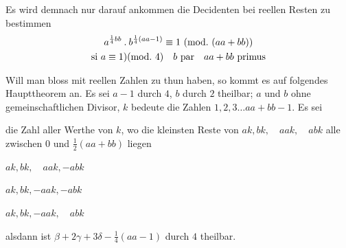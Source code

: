Es wird demnach nur darauf ankommen die Decidenten bei reellen Resten zu bestimmen
\[
\begin{gathered}
a^{\frac14bb}\mathbin{.} b^{\frac14(aa-1)}\equiv1\ (\mathrm{mod.}\ (aa+bb))\\
\text{si }a\equiv1)(\mathrm{mod.}\ 4)\quad b\text{ par}\quad aa+bb\text{ primus}
\end{gathered}
\]

Will man bloss mit reellen Zahlen zu thun haben, so kommt es auf folgendes Haupttheorem an. Es sei $a-1$ durch $4$, $b$ durch $2$ theilbar; $a$ und $b$ ohne gemeinschaftlichen Divisor, $k$ bedeute die Zahlen $1,2,3\ldots aa+bb-1$.
Es sei
\begin{list}{}{\setlength{\labelwidth}{1.5em}\setlength{\leftmargin}{2em}}
\item[$\alpha$] die Zahl aller Werthe von $k$, wo die kleinsten Reste von $ak,\allowbreak bk,\quad\allowbreak aak,\quad\allowbreak abk$ alle zwischen $0$ und $\frac12(aa+bb)$ liegen
\item[$\beta$] $ak,bk,\quad aak,-abk$
\item[$\gamma$] $ak,bk,-aak,-abk$
\item[$\delta$] $ak,bk,-aak,\quad abk$
\end{list}
alsdann ist $\beta+2\gamma+3\delta-\frac14(aa-1)$ durch $4$ theilbar.

